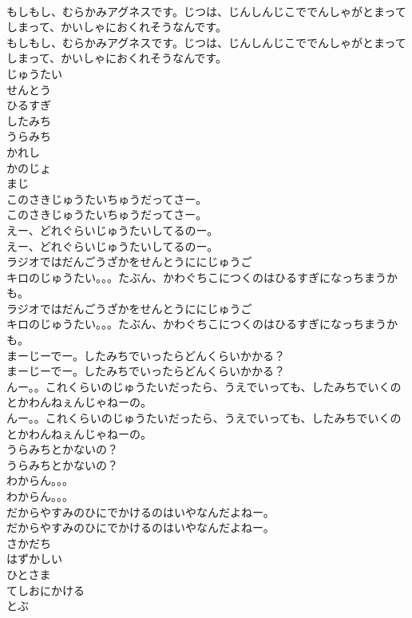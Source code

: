 \documentclass[8pt]{extreport}
\begin{document}
\begin{CJK}{UTF8}{min}
\\	もしもし、むらかみアグネスです。じつは、じんしんじこででんしゃがとまってしまって、かいしゃにおくれそうなんです。
\\	もしもし、むらかみアグネスです。じつは、じんしんじこででんしゃがとまってしまって、かいしゃにおくれそうなんです。
\\	じゅうたい
\\	せんとう
\\	ひるすぎ
\\	したみち
\\	うらみち
\\	かれし
\\	かのじょ
\\	まじ
\\	このさきじゅうたいちゅうだってさー。
\\	このさきじゅうたいちゅうだってさー。
\\	えー、どれぐらいじゅうたいしてるのー。
\\	えー、どれぐらいじゅうたいしてるのー。
\\	ラジオではだんごうざかをせんとうににじゅうご
\\	キロのじゅうたい。。。たぶん、かわぐちこにつくのはひるすぎになっちまうかも。
\\	ラジオではだんごうざかをせんとうににじゅうご
\\	キロのじゅうたい。。。たぶん、かわぐちこにつくのはひるすぎになっちまうかも。
\\	まーじーでー。したみちでいったらどんくらいかかる？
\\	まーじーでー。したみちでいったらどんくらいかかる？
\\	んー。。これくらいのじゅうたいだったら、うえでいっても、したみちでいくのとかわんねぇんじゃねーの。
\\	んー。。これくらいのじゅうたいだったら、うえでいっても、したみちでいくのとかわんねぇんじゃねーの。
\\	うらみちとかないの？
\\	うらみちとかないの？
\\	わからん。。。
\\	わからん。。。
\\	だからやすみのひにでかけるのはいやなんだよねー。
\\	だからやすみのひにでかけるのはいやなんだよねー。
\\	さかだち
\\	はずかしい
\\	ひとさま
\\	てしおにかける
\\	とぶ

\end{CJK}
\end{document}
